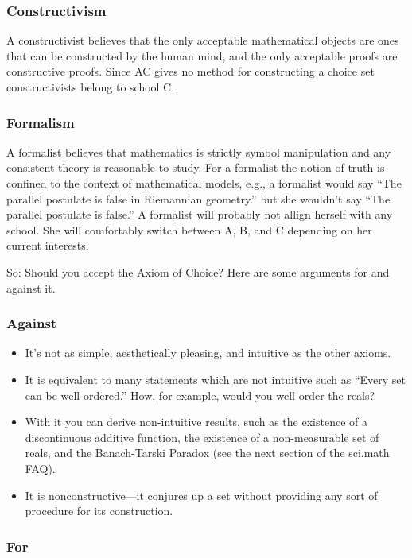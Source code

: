\subsubsection{Constructivism}

A constructivist believes that the only acceptable mathematical objects
are ones that can be constructed by the human mind, and the only
acceptable proofs are constructive proofs.  Since AC gives no method for
constructing a choice set constructivists belong to school C.

\subsubsection{Formalism}

A formalist believes that mathematics is strictly symbol manipulation
and any consistent theory is reasonable to study.  For a formalist the
notion of truth is confined to the context of mathematical models, e.g.,
a formalist would say ``The parallel postulate is false in Riemannian
geometry.'' but she wouldn't say ``The parallel postulate is false.''  A
formalist will probably not allign herself with any school.  She will
comfortably switch between A, B, and C depending on her current
interests.


So: Should you accept the Axiom of Choice?  Here are some arguments for
and against it.

\subsubsection{Against}

\begin{itemize}
  \item It's not as simple, aesthetically pleasing, and intuitive as the
  other axioms.
  \item It is equivalent to many statements which are not intuitive such
  as ``Every set can be well ordered.''  How, for example, would you
  well order the reals?
  \item With it you can derive non-intuitive results, such as the
  existence of a discontinuous additive function, the existence of a
  non-measurable set of reals, and the Banach-Tarski Paradox (see the
  next section of the sci.math FAQ).
  \item It is nonconstructive---it conjures up a set without providing
  any sort of procedure for its construction.
\end{itemize}

\subsubsection{For}

